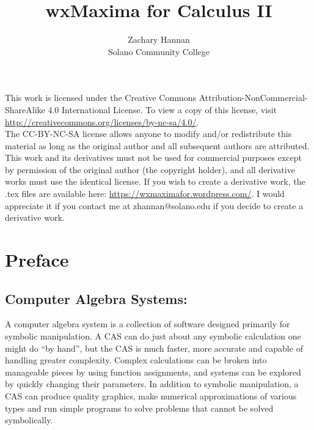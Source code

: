 \documentclass[10.5pt,twoside]{report}
\theoremstyle{definition}
\begin{document}
\title{wxMaxima for Calculus II}

\author{Zachary Hannan\\ Solano Community College}



\date{}

\maketitle

\pagebreak
\vspace*{\fill}

This work is licensed under the Creative Commons Attribution-NonCommercial-ShareAlike 4.0 International License. To view a copy of this license, visit \url{http://creativecommons.org/licenses/by-nc-sa/4.0/}.
${}$\\

The CC-BY-NC-SA license allows anyone to modify and/or redistribute this material as long as the original author and all subsequent authors are attributed.  This work and its derivatives must not be used for commercial purposes except by permission of the original author (the copyright holder), and all derivative works must use the identical license. If you wish to create a derivative work, the .tex files are available here:  \url{https://wxmaximafor.wordpress.com/}.  I would appreciate  it if you contact me at zhannan@solano.edu if you decide to create a derivative work.




\vspace*{\fill}
\pagebreak
{}
\setcounter{page}{3}

\dominitoc
\tableofcontents
\setcounter{chapter}{-1}



\pagebreak

\chapter*{Preface}

\section*{\large{Computer Algebra Systems:}}

A computer algebra system is a collection of software designed primarily for symbolic manipulation.  A CAS can do just about any symbolic calculation one might do ``by hand'', but the CAS is much faster, more accurate and capable of handling greater complexity.  Complex calculations can be broken into manageable pieces by using function assignments, and systems can be explored by quickly changing their parameters.  In addition to symbolic manipulation, a CAS can produce quality graphics, make numerical approximations of various types and run simple programs to solve problems that cannot be solved symbolically.
\end{document}
